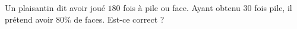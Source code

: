 
\begin{exercice}\label{exoPremiere-0009}

    Un plaisantin dit avoir joué \( 180\) fois à pile ou face. Ayant obtenu \( 30\) fois pile, il prétend avoir \( 80\%\) de faces. Est-ce correct ?

\end{exercice}
